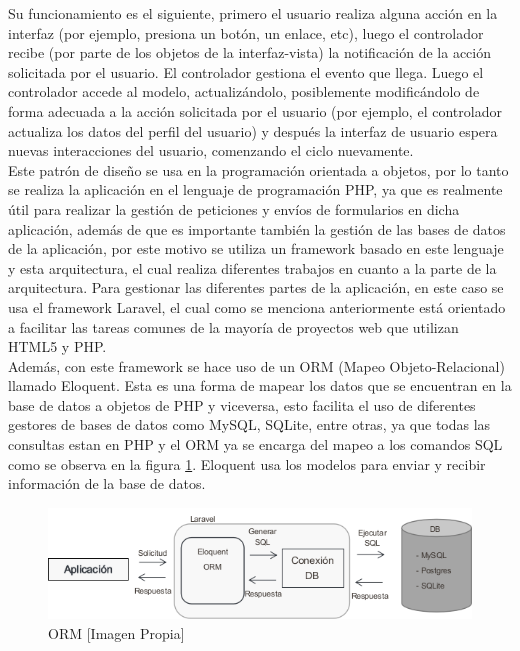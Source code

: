 Su funcionamiento es el siguiente, primero el usuario realiza alguna acción en la interfaz (por ejemplo, presiona un botón, un enlace, etc), luego el controlador recibe (por parte de los objetos de la interfaz-vista) la notificación de la acción solicitada por el usuario. El controlador gestiona el evento que llega. Luego el controlador accede al modelo, actualizándolo, posiblemente modificándolo de forma adecuada a la acción solicitada por el usuario (por ejemplo, el controlador actualiza los datos del perfil del usuario) y después la interfaz de usuario espera nuevas interacciones del usuario, comenzando el ciclo nuevamente.\\

Este patrón de diseño se usa en la programación orientada a objetos, por lo tanto se realiza la aplicación en el lenguaje de programación PHP, ya que es realmente útil para realizar la gestión de peticiones y envíos de formularios en dicha aplicación, además de que es importante también la gestión de las bases de datos de la aplicación, por este motivo se utiliza un framework basado en este lenguaje y esta arquitectura, el cual realiza diferentes trabajos en cuanto a la parte de la arquitectura. Para gestionar las diferentes partes de la aplicación, en este caso se usa el framework Laravel, el cual como se menciona anteriormente está orientado a facilitar las tareas comunes de la mayoría de proyectos web que utilizan HTML5 y PHP.\\

Además, con este framework se hace uso de un ORM (Mapeo Objeto-Relacional) llamado Eloquent. Esta es una forma de mapear los datos que se encuentran en la base de datos a objetos de PHP y viceversa, esto facilita el uso de diferentes gestores de bases de datos como MySQL, SQLite, entre otras, ya que todas las consultas estan en PHP y el ORM ya se encarga del mapeo a los comandos SQL como se observa en la figura \ref{fig:orm}. Eloquent usa los modelos para enviar y recibir información de la base de datos.\\

\begin{figure}[H]
	\centering
	\caption[ORM]{ORM [Imagen Propia]}
	\label{fig:orm}
	\includegraphics[width=0.7\linewidth]{Imagenes/ORM}
\end{figure}


